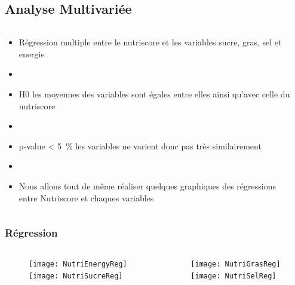 \subsection{Analyse Multivariée}
\begin{frame}{\insertsubsection}
  \begin{columns}
    \begin{column}{.5\textwidth}
      \begin{itemize}
        \item Régression multiple entre le nutriscore et les variables
        sucre, gras, sel et energie
        \item[]
        \item H0 les moyennes des variables sont égales entre elles
        ainsi qu'avec celle du nutriscore
        \item[]
        \item p-value \qty{< 5}{\percent} les variables ne varient donc pas très similairement
        \item[]
        \item Nous allons tout de même réaliser quelques graphiques des régressions
        entre Nutriscore et chaques variables 
      \end{itemize}
    \end{column}
    \begin{column}{.5\textwidth}
      \begin{table}
        \tiny
        
      \end{table}
    \end{column}
  \end{columns}
\end{frame}

\subsubsection{Régression}
\begin{frame}{\insertsubsubsection}
  \begin{columns}
    \begin{column}{.5\textwidth}
      \begin{figure}
        \texttt{[image: NutriEnergyReg]}
        \texttt{[image: NutriSucreReg]}
      \end{figure}
    \end{column}
    \begin{column}{.5\textwidth}
      \begin{figure}
        \texttt{[image: NutriGrasReg]}
        \texttt{[image: NutriSelReg]}
      \end{figure}
    \end{column}
  \end{columns}
\end{frame}


